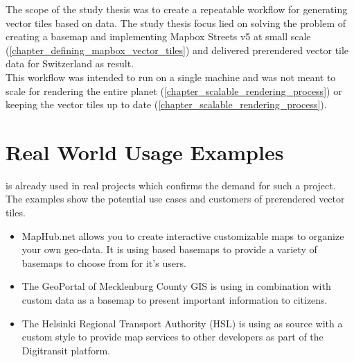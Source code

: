 The scope of the study thesis was to create a repeatable workflow for generating vector tiles based on \osm{} data. The study thesis focus lied on solving the problem of creating a basemap and implementing Mapbox Streets v5 at small scale (\autoref{chapter_defining_mapbox_vector_tiles}) and delivered prerendered vector tile data for Switzerland as result.\\
This workflow was intended to run on a single machine and was not meant to scale for rendering the entire planet (\autoref{chapter_scalable_rendering_process}) or keeping the vector tiles up to date (\autoref{chapter_scalable_rendering_process}).



\section{Real World Usage Examples}\label{part1_examples}

\osmvt{} is already used in real projects which confirms the demand for such a project. The examples show the potential use cases and customers of prerendered vector tiles.


\begin{itemize}
    \item MapHub.net allows you to create interactive customizable maps to organize your own geo-data. It is using \osmvt{} based basemaps to provide a variety of basemaps to choose from for it’s users.
    \item The GeoPortal of Mecklenburg County GIS is using \osmvt{} in combination with custom data as a basemap to present important information to citizens.
    \item The Helsinki Regional Transport Authority (HSL) is using \osmvt{} as source with a custom style to provide map services to other developers as part of the Digitransit platform.
\end{itemize}